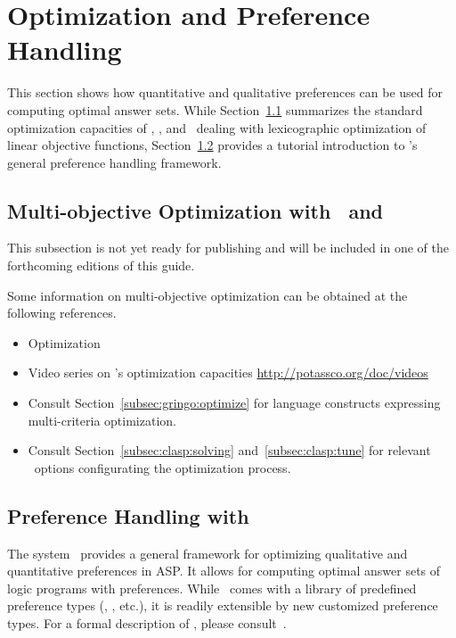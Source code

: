 
\section{Optimization and Preference Handling}
\label{sec:prefopt}

This section shows how quantitative and qualitative preferences can be used for computing optimal answer sets.
While Section~\ref{sec:optimization} summarizes the standard optimization capacities of \clasp, \gringo, and \clingo\
dealing with lexicographic optimization of linear objective functions,
Section~\ref{sec:asprin} provides a tutorial introduction to \asprin's general preference handling framework.

\subsection{Multi-objective Optimization with \clasp\ and \clingo}
\label{sec:optimization}

This subsection is not yet ready for publishing
and will be included in one of the forthcoming editions of this guide.

Some information on multi-objective optimization
can be obtained at the following references.

\begin{itemize}
\item Optimization \cite{gekakasc11b,gekakasc11c,gekasc11b,ankamasc12a}
\item Video series on \clasp's optimization capacities \url{http://potassco.org/doc/videos}
\item Consult Section~\ref{subsec:gringo:optimize} for language constructs expressing multi-criteria optimization.
\item Consult Section~\ref{subsec:clasp:solving} and~\ref{subsec:clasp:tune} for relevant \clasp\ options configurating the optimization process.
\end{itemize}

\subsection{Preference Handling with \asprin}\label{sec:asprin}
The system \asprin\ provides a general framework for optimizing qualitative and quantitative preferences in ASP.
It allows for computing optimal answer sets of logic programs with preferences.
While \asprin\ comes with a library of predefined preference types 
(\code{subset}, \code{pareto}, etc.),
it is readily extensible by new customized preference types.
For a formal description of \asprin, please consult~\cite{brderosc15a}.

